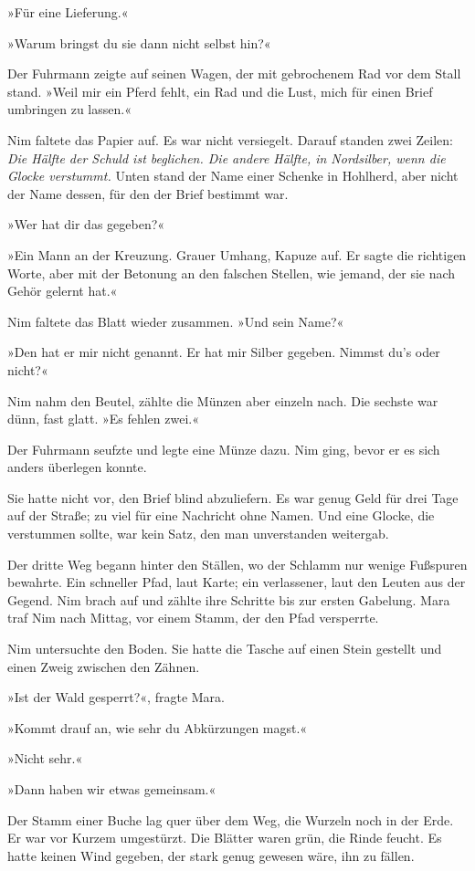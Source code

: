 \documentclass[10pt,a4paper]{article}
\begin{document}
»Für eine Lieferung.«

»Warum bringst du sie dann nicht selbst hin?«

Der Fuhrmann zeigte auf seinen Wagen, der mit gebrochenem Rad vor dem Stall stand. »Weil mir ein Pferd fehlt, ein Rad und die Lust, mich für einen Brief umbringen zu lassen.«

Nim faltete das Papier auf. Es war nicht versiegelt. Darauf standen zwei Zeilen: \emph{Die Hälfte der Schuld ist beglichen. Die andere Hälfte, in Nordsilber, wenn die Glocke verstummt.} Unten stand der Name einer Schenke in Hohlherd, aber nicht der Name dessen, für den der Brief bestimmt war.

»Wer hat dir das gegeben?«

»Ein Mann an der Kreuzung. Grauer Umhang, Kapuze auf. Er sagte die richtigen Worte, aber mit der Betonung an den falschen Stellen, wie jemand, der sie nach Gehör gelernt hat.«

Nim faltete das Blatt wieder zusammen. »Und sein Name?«

»Den hat er mir nicht genannt. Er hat mir Silber gegeben. Nimmst du's oder nicht?«

Nim nahm den Beutel, zählte die Münzen aber einzeln nach. Die sechste war dünn, fast glatt. »Es fehlen zwei.«

Der Fuhrmann seufzte und legte eine Münze dazu. Nim ging, bevor er es sich anders überlegen konnte.

Sie hatte nicht vor, den Brief blind abzuliefern. Es war genug Geld für drei Tage auf der Straße; zu viel für eine Nachricht ohne Namen. Und eine Glocke, die verstummen sollte, war kein Satz, den man unverstanden weitergab.

Der dritte Weg begann hinter den Ställen, wo der Schlamm nur wenige Fußspuren bewahrte. Ein schneller Pfad, laut Karte; ein verlassener, laut den Leuten aus der Gegend. Nim brach auf und zählte ihre Schritte bis zur ersten Gabelung.
Mara traf Nim nach Mittag, vor einem Stamm, der den Pfad versperrte.

Nim untersuchte den Boden. Sie hatte die Tasche auf einen Stein gestellt und einen Zweig zwischen den Zähnen.

»Ist der Wald gesperrt?«, fragte Mara.

»Kommt drauf an, wie sehr du Abkürzungen magst.«

»Nicht sehr.«

»Dann haben wir etwas gemeinsam.«

Der Stamm einer Buche lag quer über dem Weg, die Wurzeln noch in der Erde. Er war vor Kurzem umgestürzt. Die Blätter waren grün, die Rinde feucht. Es hatte keinen Wind gegeben, der stark genug gewesen wäre, ihn zu fällen.
\end{document}
